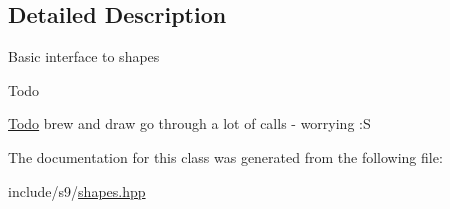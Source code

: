 \subsection{Detailed Description}
Basic interface to shapes \begin{DoxyRefDesc}{Todo}
\item[\hyperlink{todo__todo000040}{Todo}]brew and draw go through a lot of calls -\/ worrying \-:S \end{DoxyRefDesc}


The documentation for this class was generated from the following file\-:\begin{DoxyCompactItemize}
\item 
include/s9/\hyperlink{shapes_8hpp}{shapes.\-hpp}\end{DoxyCompactItemize}
